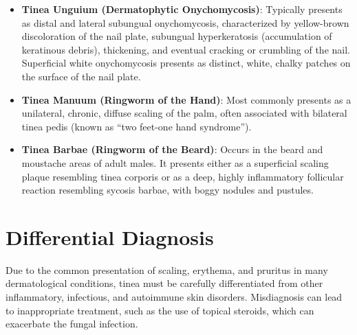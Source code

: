 \begin{itemize}
\begin{itemize}
        \item \textit{Inflammatory Type (Kerion)}: A severe, localized, cell-mediated hypersensitivity reaction presenting as a painful, boggy, swollen mass or abscess-like lesion studded with follicular pustules and thick yellow crusts. It is accompanied by cervical and occipital lymphadenopathy and can lead to permanent scarring alopecia.
        \item \textit{Favus}: A rare, severe form characterized by cup-shaped yellow crusts called scutula surrounding hair follicles, which emit a musty, mouse-like odour.
    \end{itemize}
    \item \textbf{Tinea Unguium (Dermatophytic Onychomycosis)}: Typically presents as distal and lateral subungual onychomycosis, characterized by yellow-brown discoloration of the nail plate, subungual hyperkeratosis (accumulation of keratinous debris), thickening, and eventual cracking or crumbling of the nail. Superficial white onychomycosis presents as distinct, white, chalky patches on the surface of the nail plate.
    \item \textbf{Tinea Manuum (Ringworm of the Hand)}: Most commonly presents as a unilateral, chronic, diffuse scaling of the palm, often associated with bilateral tinea pedis (known as ``two feet-one hand syndrome'').
    \item \textbf{Tinea Barbae (Ringworm of the Beard)}: Occurs in the beard and moustache areas of adult males. It presents either as a superficial scaling plaque resembling tinea corporis or as a deep, highly inflammatory follicular reaction resembling sycosis barbae, with boggy nodules and pustules.
\end{itemize}

\section*{Differential Diagnosis}
Due to the common presentation of scaling, erythema, and pruritus in many dermatological conditions, tinea must be carefully differentiated from other inflammatory, infectious, and autoimmune skin disorders. Misdiagnosis can lead to inappropriate treatment, such as the use of topical steroids, which can exacerbate the fungal infection.

